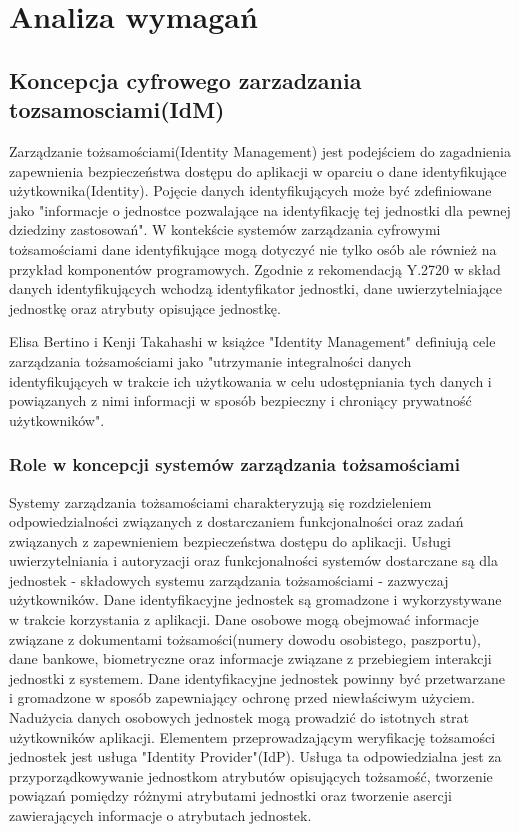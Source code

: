 \chapter{Analiza wymagań}
\label{cha:analizaWymagan}


\section{Koncepcja cyfrowego zarzadzania tozsamosciami(IdM)}
\label{sec:konceptcjaIdM}

Zarządzanie tożsamościami(Identity Management) jest podejściem do zagadnienia zapewnienia bezpieczeństwa dostępu do aplikacji w oparciu o dane identyfikujące użytkownika(Identity). Pojęcie danych identyfikujących może być zdefiniowane jako "informacje o jednostce pozwalające na identyfikację tej jednostki dla pewnej dziedziny zastosowań"\cite{Itu09}. W kontekście systemów zarządzania cyfrowymi tożsamościami dane identyfikujące mogą dotyczyć nie tylko osób ale również na przykład komponentów programowych\cite{Bertino11}. Zgodnie z rekomendacją Y.2720 w skład danych identyfikujących wchodzą identyfikator jednostki, dane uwierzytelniające jednostkę oraz atrybuty opisujące jednostkę\cite{Itu09}.

Elisa Bertino i Kenji Takahashi w książce "Identity Management" definiują cele zarządzania tożsamościami jako "utrzymanie integralności danych identyfikujących w trakcie ich użytkowania w celu udostępniania tych danych i powiązanych z nimi informacji w sposób bezpieczny i chroniący prywatność użytkowników"\cite{Bertino11}.
 
\subsection{Role w koncepcji systemów zarządzania tożsamościami}

Systemy zarządzania tożsamościami charakteryzują się rozdzieleniem odpowiedzialności związanych z dostarczaniem funkcjonalności oraz zadań związanych z zapewnieniem bezpieczeństwa dostępu do aplikacji. Usługi uwierzytelniania i autoryzacji oraz funkcjonalności systemów dostarczane są dla jednostek - składowych systemu zarządzania tożsamościami - zazwyczaj użytkowników.
Dane identyfikacyjne jednostek są gromadzone i wykorzystywane w trakcie korzystania z aplikacji. Dane osobowe mogą obejmować informacje związane z dokumentami tożsamości(numery dowodu osobistego, paszportu), dane bankowe, biometryczne oraz informacje związane z przebiegiem interakcji jednostki z systemem. Dane identyfikacyjne jednostek powinny być przetwarzane i gromadzone w sposób zapewniający  ochronę przed niewłaściwym użyciem. Nadużycia danych osobowych jednostek mogą prowadzić do istotnych strat użytkowników aplikacji.
Elementem przeprowadzającym weryfikację tożsamości jednostek jest usługa "Identity Provider"(IdP). Usługa ta odpowiedzialna jest za przyporządkowywanie jednostkom atrybutów opisujących tożsamość, tworzenie powiązań pomiędzy różnymi atrybutami jednostki oraz tworzenie asercji zawierających informacje o atrybutach jednostek. 

